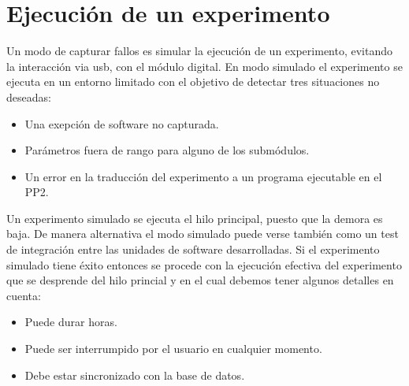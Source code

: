 \section{Ejecuci\'on de un experimento}

Un modo de capturar fallos es simular la ejecuci\'on de un experimento,
evitando la interacci\'on via usb, con el m\'odulo digital.
En modo simulado el experimento se ejecuta en un entorno limitado con el objetivo de
detectar tres situaciones no deseadas:

\begin{itemize}
\item Una exepci\'on de software no capturada.
\item Par\'ametros fuera de rango para alguno de los subm\'odulos.
\item Un error en la traducci\'on del experimento a un programa ejecutable en el PP2.
\end{itemize}

Un experimento simulado se ejecuta el hilo principal, puesto que 
la demora es baja. De manera alternativa el modo simulado puede verse tambi\'en como un 
test de integraci\'on entre las unidades de software desarrolladas.
Si el experimento simulado tiene \'exito entonces se procede con la ejecuci\'on efectiva
del experimento que se desprende del hilo princial y en el cual debemos tener 
algunos detalles en cuenta:

\begin{itemize}
    \item Puede durar horas.
    \item Puede ser interrumpido por el usuario en cualquier momento.
    \item Debe estar sincronizado con la base de datos.
\end{itemize}
\newpage